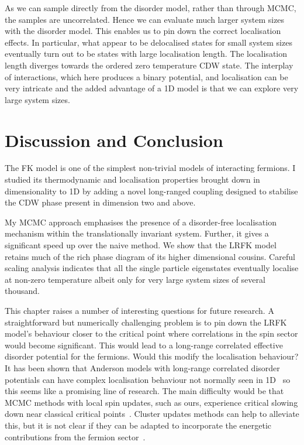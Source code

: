 As we can sample directly from the disorder model, rather than through MCMC, the samples are uncorrelated. Hence we can evaluate much larger system sizes with the disorder model. This enables us to pin down the correct localisation effects. In particular, what appear to be delocalised states for small system sizes eventually turn out to be states with large localisation length. The localisation length diverges towards the ordered zero temperature CDW state. The interplay of interactions, which here produces a binary potential, and localisation can be very intricate and the added advantage of a 1D model is that we can explore very large system sizes.

\hypertarget{fk-conclusion}{%
\section{Discussion and Conclusion}\label{fk-conclusion}}

The FK model is one of the simplest non-trivial models of interacting fermions. I studied its thermodynamic and localisation properties brought down in dimensionality to 1D by adding a novel long-ranged coupling designed to stabilise the CDW phase present in dimension two and above.

My MCMC approach emphasises the presence of a disorder-free localisation mechanism within the translationally invariant system. Further, it gives a significant speed up over the naive method. We show that the LRFK model retains much of the rich phase diagram of its higher dimensional cousins. Careful scaling analysis indicates that all the single particle eigenstates eventually localise at non-zero temperature albeit only for very large system sizes of several thousand.

This chapter raises a number of interesting questions for future research. A straightforward but numerically challenging problem is to pin down the LRFK model's behaviour closer to the critical point where correlations in the spin sector would become significant. This would lead to a long-range correlated effective disorder potential for the fermions. Would this modify the localisation behaviour? It has been shown that Anderson models with long-range correlated disorder potentials can have complex localisation behaviour not normally seen in 1D~\autocite{aubryAnalyticityBreakingAnderson1980,shimasakiAnomalousLocalizationMultifractality2022} so this seems like a promising line of research. The main difficulty would be that MCMC methods with local spin updates, such as ours, experience critical slowing down near classical critical points~\autocite{geyerPracticalMarkovChain1992,levinMarkovChainsMixing2017,vatsMultivariateOutputAnalysis2015}. Cluster updates methods can help to alleviate this, but it is not clear if they can be adapted to incorporate the energetic contributions from the fermion sector~\autocite{evertzClusterAlgorithmVertex1993,fukuiOrderNClusterMonte2009,wolffCollectiveMonteCarlo1989}.

